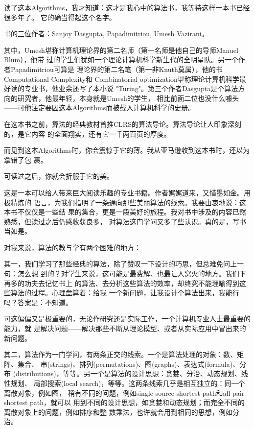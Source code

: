 \documentclass[11pt]{article}
\begin{document}
读了这本Algorithms，我才知道：这才是我心中的算法书，我等待这样一本书已经很多年了。
它的确当得起这个名字。

书的三位作者：Sanjoy Dasgupta, Papadimitriou, Umesh Vazirani。

其中，Umesh堪称计算机理论界的第二名师（第一名师是他自己的导师Manuel Blum），他带
过的学生们犹如一个理论计算机科学新生代的全明星队。另一个作者Papadimitriou可算是
理论界的第二名笔（第一非Knuth莫属），他的书Computational Complexity和
Combinatorial optimization堪称理论计算机科学最好读的专业书，他业余还写了本小说
"Turing"。第三个作者Dasgupta是个算法方向的研究者，他最年轻，本身就是Umesh的学生，
相比前面二位也没什么噱头——可他注定要因这本Algorithms而被载入计算机科学的史册。

在这本书之前，算法的经典教材首推CLRS的算法导论。算法导论让人印象深刻的，是它内容
的全面翔实，还有它一千两百页的厚度。

而见到这本Algorithms时，你会震惊于它的薄。我从亚马逊收到这本书时，还以为拿错了包
裹。

可读过之后，你就会折服于它的美。

这是一本可以给人带来巨大阅读乐趣的专业书籍。作者娓娓道来，又惜墨如金。用极精炼的
语言，为我们指明了一条通向那些美丽算法的线索。我要由衷地说：这本书不仅仅是一些结
果的集合，更是一段美好的旅程。我对书中涉及的内容已然熟悉，但读过之后仍感收获良多，
对算法这门学问又多了些认识。真的是，写书当如是。


对我来说，算法的教与学有两个困难的地方：

其一，我们学习了那些经典的算法，除了赞叹一下设计的巧思，但总难免问上一句：怎么想
到的？对学生来说，这可能是最费解、也最让人窝火的地方。我们下再多的功夫去记忆书上
的算法、去分析这些算法的效率，却终究不能理喻得到这些算法的过程。心理盘算着：给我
一个新问题，让我设计个算法出来，我能行吗？答案是：不知道。

可这偏偏又是极重要的，无论作研究还是实际工作，一个计算机专业人士最重要的能力，就
是解决问题——解决那些不断从理论模型、或者从实际应用中冒出来的新问题。

其二，算法作为一门学问，有两条正交的线索。一个是算法处理的对象：数、矩阵、集合、
串(strings)、排列(permutations)、图(graphs)、表达式(formula)、分布
(distributions)，等等。另一个是算法的设计思想：贪婪、分治、动态规划、线性规划、
局部搜索(local search)，等等。这两条线索几乎是相互独立的：同一个离散对象，例如图，
稍有不同的问题，例如single-source shortest path和all-pair shortest path，就可以
用到不同的设计思想，如贪婪和动态规划；而完全不同的离散对象上的问题，例如排序和整
数乘法，也许就会用到相同的思想，例如分治。
\end{document}
